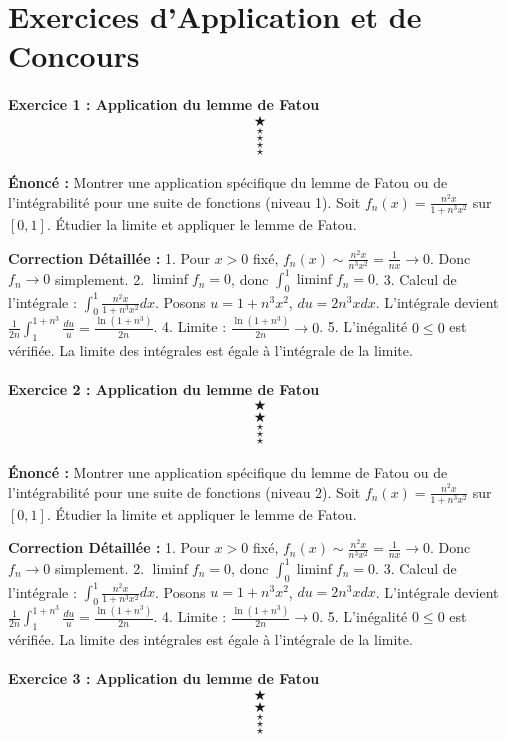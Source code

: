 \documentclass[11pt,a4paper]{article}
\begin{document}
\part{Exercices d'Application et de Concours}
\subsection*{Exercice 1 : Application du lemme de Fatou $$\bigstar$$$$\star$$$$\star$$$$\star$$$$\star$$}

\textbf{Énoncé :}
Montrer une application spécifique du lemme de Fatou ou de l'intégrabilité pour une suite de fonctions (niveau 1).
Soit $f_n(x) = \frac{n^2 x}{1 + n^3 x^2}$ sur $[0, 1]$.
Étudier la limite et appliquer le lemme de Fatou.

\textbf{Correction Détaillée :}
1. Pour $x > 0$ fixé, $f_n(x) \sim \frac{n^2 x}{n^3 x^2} = \frac{1}{n x} \to 0$. Donc $f_n \to 0$ simplement.
2. $\liminf f_n = 0$, donc $\int_0^1 \liminf f_n = 0$.
3. Calcul de l'intégrale : $\int_0^1 \frac{n^2 x}{1 + n^3 x^2} dx$.
   Posons $u = 1 + n^3 x^2$, $du = 2 n^3 x dx$.
   L'intégrale devient $\frac{1}{2n} \int_1^{1+n^3} \frac{du}{u} = \frac{\ln(1+n^3)}{2n}$.
4. Limite : $\frac{\ln(1+n^3)}{2n} \to 0$.
5. L'inégalité $0 \le 0$ est vérifiée. La limite des intégrales est égale à l'intégrale de la limite.


\subsection*{Exercice 2 : Application du lemme de Fatou $$\bigstar$$$$\bigstar$$$$\star$$$$\star$$$$\star$$}

\textbf{Énoncé :}
Montrer une application spécifique du lemme de Fatou ou de l'intégrabilité pour une suite de fonctions (niveau 2).
Soit $f_n(x) = \frac{n^2 x}{1 + n^3 x^2}$ sur $[0, 1]$.
Étudier la limite et appliquer le lemme de Fatou.

\textbf{Correction Détaillée :}
1. Pour $x > 0$ fixé, $f_n(x) \sim \frac{n^2 x}{n^3 x^2} = \frac{1}{n x} \to 0$. Donc $f_n \to 0$ simplement.
2. $\liminf f_n = 0$, donc $\int_0^1 \liminf f_n = 0$.
3. Calcul de l'intégrale : $\int_0^1 \frac{n^2 x}{1 + n^3 x^2} dx$.
   Posons $u = 1 + n^3 x^2$, $du = 2 n^3 x dx$.
   L'intégrale devient $\frac{1}{2n} \int_1^{1+n^3} \frac{du}{u} = \frac{\ln(1+n^3)}{2n}$.
4. Limite : $\frac{\ln(1+n^3)}{2n} \to 0$.
5. L'inégalité $0 \le 0$ est vérifiée. La limite des intégrales est égale à l'intégrale de la limite.


\subsection*{Exercice 3 : Application du lemme de Fatou $$\bigstar$$$$\bigstar$$$$\star$$$$\star$$$$\star$$}
\end{document}

